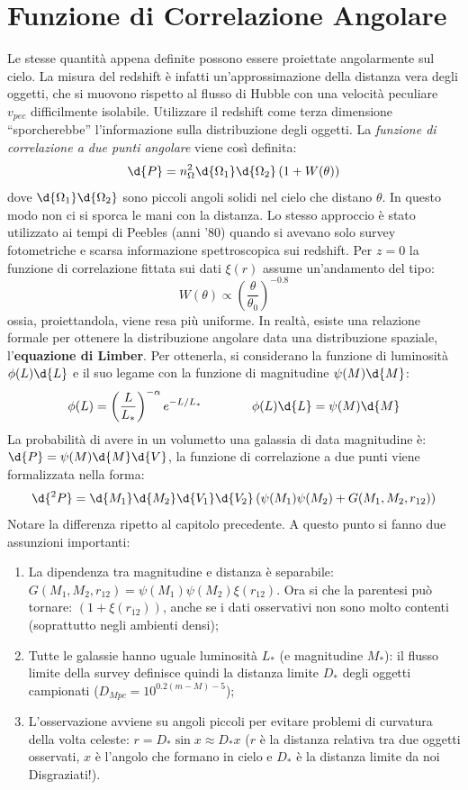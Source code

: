 \section{Funzione di Correlazione Angolare}
Le stesse quantità appena definite possono essere proiettate angolarmente sul cielo. La misura del redshift è infatti un'approssimazione della distanza vera degli oggetti, che si muovono rispetto al flusso di Hubble con una velocità peculiare $v_{pec}$ difficilmente isolabile. Utilizzare il redshift come terza dimensione ``sporcherebbe'' l'informazione sulla distribuzione degli oggetti. La \textit{funzione di correlazione a due punti angolare} viene così definita:
\begin{equation}
    \d{P}=n_\Omega^2 \d{\Omega_1}\d{\Omega_2}\left( 1+W(\theta)\right)
\end{equation}
dove $\d{\Omega_1}\d{\Omega_2}$ sono piccoli angoli solidi nel cielo che distano $\theta$. In questo modo non ci si sporca le mani con la distanza. Lo stesso approccio è stato utilizzato ai tempi di Peebles (anni '80) quando si avevano solo survey fotometriche e scarsa informazione spettroscopica sui redshift. Per $z=0$ la funzione di correlazione fittata sui dati $\xi(r)$ assume un'andamento del tipo:
$$
W(\theta)\propto \left(\frac{\theta}{\theta_0}\right)^{-0.8}
$$
ossia, proiettandola, viene resa più uniforme. In realtà, esiste una relazione formale per ottenere la distribuzione angolare data una distribuzione spaziale, l'\textbf{equazione di Limber}. Per ottenerla, si considerano la funzione di luminosità $\phi (L) \d{L}$ e il suo legame con la funzione di magnitudine $\psi (M) \d{M}$:
\begin{equation}
    \phi (L) = \left(\frac{L}{L_*}\right)^{-\alpha}e^{-L/L_*} \qquad\qquad \phi (L) \d{L}=\psi (M) \d{M}
\end{equation}
La probabilità di avere in un volumetto una galassia di data magnitudine è: $\d{P}=\psi (M) \d{M}\d{V}$, la funzione di correlazione a due punti viene formalizzata nella forma:
\begin{equation}
    \d{^2P}=\d{M_1}\d{M_2}\d{V_1}\d{V_2} \left(\psi (M_1)\psi (M_2) + G(M_1, M_2, r_{12})\right)
\end{equation}
Notare la differenza ripetto al capitolo precedente. A questo punto si fanno due assunzioni importanti:
\begin{enumerate}
    \item La dipendenza tra magnitudine e distanza è separabile: $G(M_1, M_2, r_{12})=\psi (M_1)\psi (M_2)\xi (r_{12})$. Ora si che la parentesi può tornare: $(1+\xi (r_{12}))$, anche se i dati osservativi non sono molto contenti (soprattutto negli ambienti densi);
    \item Tutte le galassie hanno uguale luminosità $L_*$ (e magnitudine $M_*$): il flusso limite della survey definisce quindi la distanza limite $D_*$ degli oggetti campionati ($D_{Mpc}=10^{0.2(m-M)-5}$);
    \item L'osservazione avviene su angoli piccoli per evitare problemi di curvatura della volta celeste: $r=D_*\sin x \approx D_* x$ ($r$ è la distanza relativa tra due oggetti osservati, $x$ è l'angolo che formano in cielo e $D_*$ è la distanza limite da noi Disgraziati!).
\end{enumerate}
